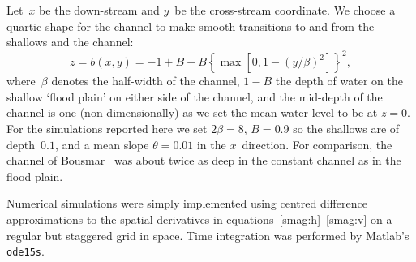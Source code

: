 \documentclass[a5paper,12pt]{article}
\newcommand{\uu}{{\bar u}}
\newcommand{\vv}{{\bar v}}
\begin{document}
Let~$x$ be the down-stream and $y$~be the cross-stream coordinate. 
We choose a quartic shape for the channel to make smooth transitions to and from the shallows and the channel: 
\begin{equation}
z=b(x,y)=-1+B-B\left\{\max\left[0,1-\left({y}/{\beta}\right)^2\right]\right\}^2,\label{bed:straight}
\end{equation}
where~$\beta$ denotes the half-width of the channel, $1-B$ the depth of water on the shallow `flood plain' on either side of the channel, and the mid-depth of the channel is one (non-dimensionally) as we set the mean water level to be at $z=0$.  
For the simulations reported here we set $2\beta=8$, $B=0.9$ so the shallows are of depth~$0.1$, and a mean slope $\theta=0.01$ in the $x$~direction.  
For comparison, the channel of Bousmar~\cite{Bousmar2002} was about twice as deep in the constant channel as in the flood plain.


Numerical simulations were simply implemented using centred difference approximations to the spatial derivatives in equations~\eqref{smag:h}--\eqref{smag:v} on a regular but staggered grid in space.
Time integration was performed by Matlab's \verb|ode15s|.
\end{document}
